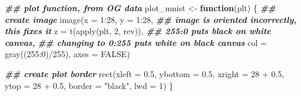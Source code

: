 \documentclass[
]{book}
\newenvironment{Shaded}{\begin{snugshade}}{\end{snugshade}}
\newcommand{\AttributeTok}[1]{\textcolor[rgb]{0.77,0.63,0.00}{#1}}
\newcommand{\ConstantTok}[1]{\textcolor[rgb]{0.00,0.00,0.00}{#1}}
\newcommand{\ControlFlowTok}[1]{\textcolor[rgb]{0.13,0.29,0.53}{\textbf{#1}}}
\newcommand{\DecValTok}[1]{\textcolor[rgb]{0.00,0.00,0.81}{#1}}
\newcommand{\DocumentationTok}[1]{\textcolor[rgb]{0.56,0.35,0.01}{\textbf{\textit{#1}}}}
\newcommand{\FloatTok}[1]{\textcolor[rgb]{0.00,0.00,0.81}{#1}}
\newcommand{\FunctionTok}[1]{\textcolor[rgb]{0.00,0.00,0.00}{#1}}
\newcommand{\NormalTok}[1]{#1}
\newcommand{\OtherTok}[1]{\textcolor[rgb]{0.56,0.35,0.01}{#1}}
\newcommand{\SpecialCharTok}[1]{\textcolor[rgb]{0.00,0.00,0.00}{#1}}
\newcommand{\StringTok}[1]{\textcolor[rgb]{0.31,0.60,0.02}{#1}}
\begin{document}
\begin{Shaded}
\begin{Highlighting}[]
\DocumentationTok{\#\# plot function, from OG data}
\NormalTok{plot\_mnist }\OtherTok{\textless{}{-}} \ControlFlowTok{function}\NormalTok{(plt) \{}
  \DocumentationTok{\#\# create image}
  \FunctionTok{image}\NormalTok{(}\AttributeTok{x =} \DecValTok{1}\SpecialCharTok{:}\DecValTok{28}\NormalTok{,}
        \AttributeTok{y =} \DecValTok{1}\SpecialCharTok{:}\DecValTok{28}\NormalTok{,}
        \DocumentationTok{\#\# image is oriented incorrectly, this fixes it}
        \AttributeTok{z =} \FunctionTok{t}\NormalTok{(}\FunctionTok{apply}\NormalTok{(plt, }\DecValTok{2}\NormalTok{, rev)),}
        \DocumentationTok{\#\# 255:0 puts black on white canvas,}
        \DocumentationTok{\#\# changing to 0:255 puts white on black canvas}
        \AttributeTok{col =} \FunctionTok{gray}\NormalTok{((}\DecValTok{255}\SpecialCharTok{:}\DecValTok{0}\NormalTok{)}\SpecialCharTok{/}\DecValTok{255}\NormalTok{),}
        \AttributeTok{axes =} \ConstantTok{FALSE}\NormalTok{)}
  
  \DocumentationTok{\#\# create plot border}
  \FunctionTok{rect}\NormalTok{(}\AttributeTok{xleft =} \FloatTok{0.5}\NormalTok{,}
       \AttributeTok{ybottom =} \FloatTok{0.5}\NormalTok{,}
       \AttributeTok{xright =} \DecValTok{28} \SpecialCharTok{+} \FloatTok{0.5}\NormalTok{,}
       \AttributeTok{ytop =} \DecValTok{28} \SpecialCharTok{+} \FloatTok{0.5}\NormalTok{,}
       \AttributeTok{border =} \StringTok{"black"}\NormalTok{,}
       \AttributeTok{lwd =} \DecValTok{1}\NormalTok{)}
\NormalTok{\}}
\end{Highlighting}
\end{Shaded}
\end{document}
